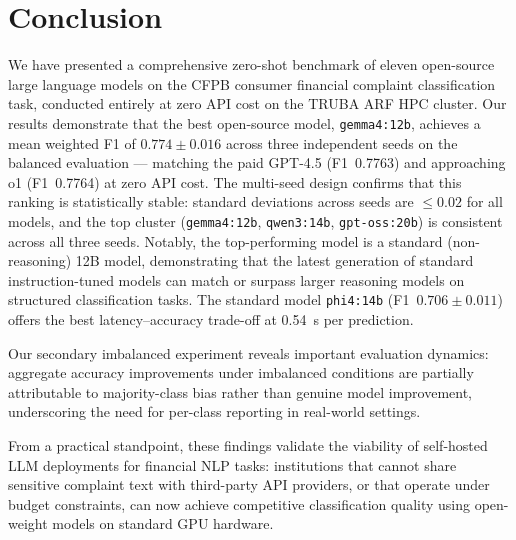 \documentclass[journal]{IEEEtran}
\begin{document}
\section{Conclusion}
\label{sec:conclusion}

We have presented a comprehensive zero-shot benchmark of eleven
open-source large language models on the CFPB consumer financial
complaint classification task, conducted entirely at zero API cost
on the TRUBA ARF HPC cluster. Our results demonstrate that the
best open-source model, \texttt{gemma4:12b}, achieves a mean weighted
F1 of $0.774 \pm 0.016$ across three independent seeds on the balanced
evaluation — matching the paid GPT-4.5 (F1~0.7763) and approaching
o1 (F1~0.7764) at zero API cost. The multi-seed design confirms that
this ranking is statistically stable: standard deviations across seeds
are $\leq 0.02$ for all models, and the top cluster
(\texttt{gemma4:12b}, \texttt{qwen3:14b}, \texttt{gpt-oss:20b})
is consistent across all three seeds. Notably, the top-performing
model is a standard (non-reasoning) 12B model, demonstrating that
the latest generation of standard instruction-tuned models can match
or surpass larger reasoning models on structured classification tasks.
The standard model \texttt{phi4:14b} (F1~$0.706 \pm 0.011$)
offers the best latency–accuracy trade-off at 0.54~s per prediction.

Our secondary imbalanced experiment reveals important evaluation
dynamics: aggregate accuracy improvements under imbalanced
conditions are partially attributable to majority-class bias
rather than genuine model improvement, underscoring the need for
per-class reporting in real-world settings.

From a practical standpoint, these findings validate the viability
of self-hosted LLM deployments for financial NLP tasks: institutions
that cannot share sensitive complaint text with third-party API
providers, or that operate under budget constraints, can now achieve
competitive classification quality using open-weight models on
standard GPU hardware.
\end{document}
